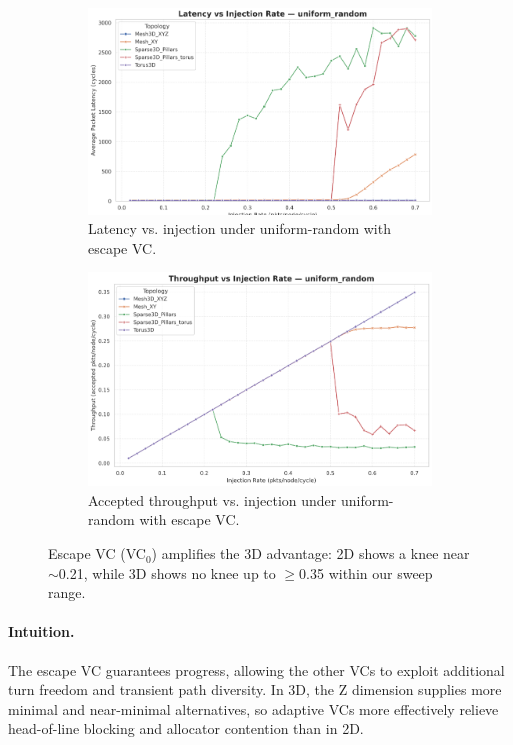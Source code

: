 \documentclass[11pt]{article}
\begin{document}
\begin{figure}[htbp]
  \centering
  \begin{subfigure}[t]{0.48\linewidth}
    \centering
    \includegraphics[width=\linewidth]{./figs/escape_lat_vs_inj.png}%
    \caption{Latency vs. injection under uniform-random with escape VC.}
  \end{subfigure}\hfill
  \begin{subfigure}[t]{0.48\linewidth}
    \centering
    \includegraphics[width=\linewidth]{./figs/escape_thr_vs_inj.png}%
    \caption{Accepted throughput vs. injection under uniform-random with escape VC.}
  \end{subfigure}
  \caption{Escape VC (VC$_0$) amplifies the 3D advantage: 2D shows a knee near $\sim$0.21, while 3D shows no knee up to $\geq$0.35 within our sweep range.}
  \label{fig:escape-vc-results}
\end{figure}


\paragraph{Intuition.} The escape VC guarantees progress, allowing the other VCs to exploit additional turn freedom and transient path diversity. In 3D, the Z dimension supplies more minimal and near-minimal alternatives, so adaptive VCs more effectively relieve head-of-line blocking and allocator contention than in 2D.
\end{document}
